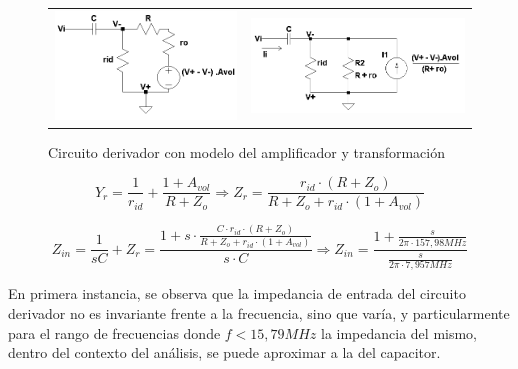 \begin{figure}[H]
\begin{tabular}{c c}
	\includegraphics[scale=0.55]{Recursos/Derivador/Circuito_derivador_modelo.png} &
	\includegraphics[scale=0.55]{Recursos/Derivador/Circuito_derivador_simplificacion.png}
\end{tabular}
\caption{Circuito derivador con modelo del amplificador y transformaci\'on}
\label{fig:circuito_derivador_impedancia}
\end{figure}

\begin{equation*}
	Y_r = \frac{1}{r_{id}} + \frac{1 + A_{vol}}{R + Z_o} \Rightarrow
	Z_r = \frac{r_{id} \cdot(R + Z_o)}{R + Z_o + r_{id} \cdot(1 + A_{vol})}
\end{equation*}

\begin{equation}
	Z_{in} = \frac{1}{sC} + Z_r
	= \frac{1 + s \cdot \frac{C \cdot r_{id} \cdot (R + Z_o)}{R + Z_o + r_{id} \cdot (1 + A_{vol})}}{s \cdot C}
	\Rightarrow
	Z_{in} = \frac{1 + \frac{s}{2 \pi \cdot 157,98MHz}}{\frac{s}{2 \pi \cdot 7,957MHz}}
	\label{eq:derivador_impedancia_avol_finito}
\end{equation}

En primera instancia, se observa que la impedancia de entrada del circuito derivador no es invariante frente a la frecuencia,
sino que var\'ia, y particularmente para el rango de frecuencias donde $f < 15,79MHz$ la impedancia del mismo, dentro del contexto del an\'alisis, se puede
aproximar a la del capacitor.


